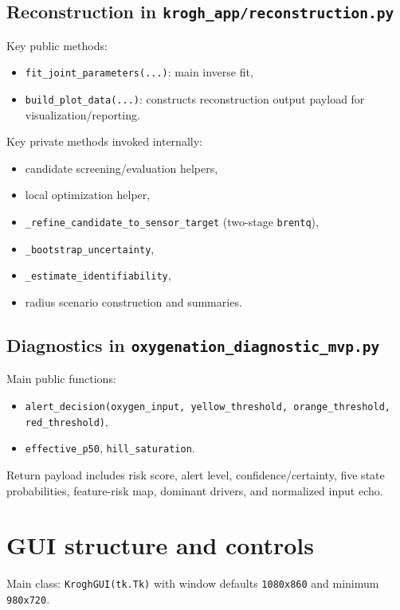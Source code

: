 \documentclass[12pt,a4paper]{article}
\begin{document}
\subsection{Reconstruction in \texttt{krogh\_app/reconstruction.py}}
Key public methods:
\begin{itemize}
    \item \texttt{fit\_joint\_parameters(...)}: main inverse fit,
    \item \texttt{build\_plot\_data(...)}: constructs reconstruction output payload for visualization/reporting.
\end{itemize}

Key private methods invoked internally:
\begin{itemize}
    \item candidate screening/evaluation helpers,
    \item local optimization helper,
    \item \texttt{\_refine\_candidate\_to\_sensor\_target} (two-stage \texttt{brentq}),
    \item \texttt{\_bootstrap\_uncertainty},
    \item \texttt{\_estimate\_identifiability},
    \item radius scenario construction and summaries.
\end{itemize}

\subsection{Diagnostics in \texttt{oxygenation\_diagnostic\_mvp.py}}
Main public functions:
\begin{itemize}
    \item \texttt{alert\_decision(oxygen\_input, yellow\_threshold, orange\_threshold, red\_threshold)},
    \item \texttt{effective\_p50}, \texttt{hill\_saturation}.
\end{itemize}

Return payload includes risk score, alert level, confidence/certainty, five state probabilities, feature-risk map, dominant drivers, and normalized input echo.

\section{GUI structure and controls}
Main class: \texttt{KroghGUI(tk.Tk)} with window defaults \texttt{1080x860} and minimum \texttt{980x720}.
\end{document}
